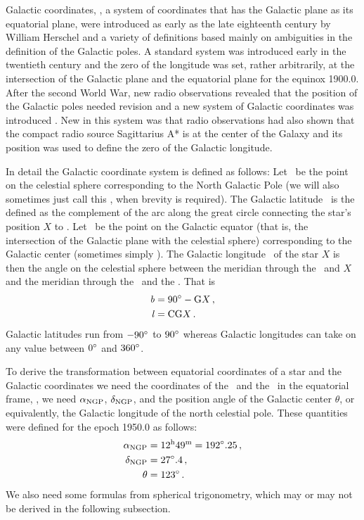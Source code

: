 Galactic coordinates, \ie, a system of coordinates that has the
Galactic plane as its equatorial plane, were introduced as early as
the late eighteenth century by William Herschel and a variety of
definitions based mainly on ambiguities in the definition of the
Galactic poles. A standard system was introduced early in the
twentieth century \citep{Ohlsson32a} and the zero of the longitude was
set, rather arbitrarily, at the intersection of the Galactic plane and
the equatorial plane for the equinox 1900.0. After the second World
War, new radio observations revealed that the position of the Galactic
poles needed revision and a new system of Galactic coordinates was
introduced \citep{1960MNRAS.121..123B}. New in this system was that
radio observations had also shown that the compact radio source
Sagittarius A* is at the center of the Galaxy and its position was
used to define the zero of the Galactic longitude.

In detail the Galactic coordinate system is defined as follows: Let
\ngp\ be the point on the celestial sphere corresponding to the North
Galactic Pole (we will also sometimes just call this \ngpg, when
brevity is required). The Galactic latitude \galb\ is the defined as
the complement of the arc along the great circle connecting the star's
position $X$ to \ngp. Let \gc\ be the point on the Galactic equator
(that is, the intersection of the Galactic plane with the celestial
sphere) corresponding to the Galactic center (sometimes simply
\gcc). The Galactic longitude \gall\ of the star $X$ is then the angle on the
celestial sphere between the meridian through the \ngp\ and $X$ and the
meridian through the \ngp\ and the \gc. That is
\begin{align}\label{eq:galcodef}
{\it b} &= 90^{\circ} - \textnormal{G} X \, ,\\
{\it l} &= \textnormal{C} \textnormal{G} X \, .
\end{align}
Galactic latitudes run from $-90^{\circ}$ to $90^{\circ}$ whereas Galactic
longitudes can take on any value between $0^{\circ}$ and $360^{\circ}$.

To derive the transformation between equatorial coordinates of a star
and the Galactic coordinates we need the coordinates of the \ngp\ and
the \gc\ in the equatorial frame, \ie, we need $\alpha_{\textnormal{NGP}}$, $\delta_{\textnormal{NGP}}$,
and the position angle of the Galactic center $\theta$, or
equivalently, the Galactic longitude of the north celestial
pole. These quantities were defined for the epoch 1950.0 as follows:
\citep{1960MNRAS.121..123B}
\begin{align}\label{eq:IAUNGPGC}
\alpha_{\textnormal{NGP}} &= 12^{\textnormal{h}}49^{\textnormal{m}} = 192^{\circ}.25\, ,\\
\delta_{\textnormal{NGP}} &= 27^{\circ}.4\, ,\\
\theta &= 123^{\circ}\, .
\end{align}
We also need some formulas from spherical trigonometry, which may or
may not be derived in the following subsection.

